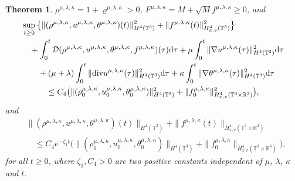 \documentclass[reqno,11pt]{amsart}
\theoremstyle{plain}
\newtheorem{thm}{Theorem}[section]
\numberwithin{equation}{section}
\begin{document}
\begin{thm}
   $\rho^{{\mu,\lambda,\kappa}}=1+\varrho^{\mu,\lambda,\kappa}>0$, 
   $F^{\mu,\lambda,\kappa}=M+\sqrt{M}f^{\mu,\lambda,\kappa}\geq 0$, and
\begin{align*}
&\sup_{t\geq 0}\big\{\|(\rho^{{\mu,\lambda,\kappa}},u^{{\mu,\lambda,\kappa}},
\theta^{{\mu,\lambda,\kappa}} )(t)\|_{H^{4}(\mathbb{T}^3) }^2
+\|f^{\mu,\lambda,\kappa}(t)\|_{H_{x,v}^4(\mathbb{T}^3) }^2\big\}\nonumber\\
& \quad +\int_{0}^{t} \mathcal{D}(\rho^{\mu,\lambda,\kappa},
u^{\mu,\lambda,\kappa},\theta^{\mu,\lambda,\kappa},f^{\mu,\lambda,\kappa})(\tau){\rm d}\tau
 +\mu\int_0^{t}\|\nabla u^{\mu,\lambda,\kappa} (\tau)\|_{H^4(\mathbb{T}^3)}^2{\rm d}\tau\nonumber\\
&\qquad
+(\mu+\lambda)\int_0^{t}\|{\rm div} u^{\mu,\lambda,\kappa} (\tau)\|_{H^4(\mathbb{T}^3)}^2{\rm d}\tau
 +\kappa\int_0^{t}\|\nabla \theta^{\mu,\lambda,\kappa} (\tau)\|_{H^4(\mathbb{T}^3)}^2{\rm d}\tau \nonumber\\
&\qquad\quad \leq C_4\big(\|(\rho^{{\mu,\lambda,\kappa}}_0,u^{{\mu,\lambda,\kappa}}_0,
\theta^{{\mu,\lambda,\kappa}}_0)\|_{H^4(\mathbb{T}^3)}^2
+\|f^{\mu,\lambda,\kappa}_0\|_{H^4_{x,v}(\mathbb{T}^3\times\mathbb{R}^3)}^2\big),
\end{align*}
and
\begin{align*}
& \|(\rho^{\mu,\lambda,\kappa},u^{\mu,\lambda,\kappa},\theta^{\mu,\lambda,\kappa})(t)\|_{H^4(\mathbb{T}^3) }
+\|f^{\mu,\lambda,\kappa}(t)\|_{H^4_{x,v}(\mathbb{T}^3\times\mathbb{R}^3) }\nonumber\\
& \quad \leq C_4e^{-\zeta_1 t}\big(\|(\rho^{{\mu,\lambda,\kappa}}_0,u^{{\mu,\lambda,\kappa}}_0,
\theta^{{\mu,\lambda,\kappa}}_0)\|_{H^4(\mathbb{T}^3)}
+\|f^{\mu,\lambda,\kappa}_0\|_{H^4_{x,v}(\mathbb{T}^3\times\mathbb{R}^3)}\big),
\end{align*}
for all $t\geq0$, where $\zeta_1,C_4 > 0$ are two positive constants 
 independent of $\mu$, $\lambda$, $\kappa$ and   $t$.
\end{thm}
\end{document}
